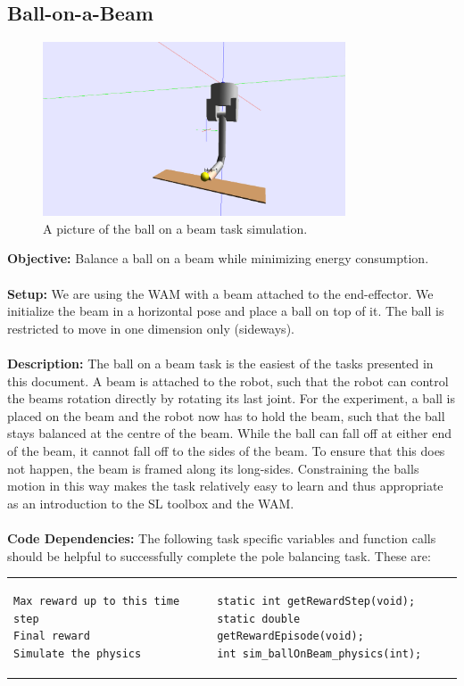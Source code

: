 \documentclass[11pt, article, colorback]{article}
\begin{document}
\subsection{Ball-on-a-Beam}
\begin{figure}
\centering
 \includegraphics[width=0.8\textwidth]{Pics/BallOnBeam.png}
  \caption{A picture of the ball on a beam task simulation.}
  \label{pic:poleBalancing}
\end{figure}
%
\textbf{Objective:} Balance a ball on a beam while minimizing energy consumption. \\ \\
%
\textbf{Setup:} We are using the WAM with a beam attached to the end-effector.
		We initialize the beam in a horizontal pose and place a ball on top of it. The ball 
		is restricted to move in one dimension only (sideways).
		 \\ \\
%
\textbf{Description:}
The ball on a beam task is the easiest of the tasks presented in this document. A beam is attached 
to the robot, such that the robot can control the beams rotation directly by rotating its last joint. 
For the experiment, a ball is placed on the beam and the robot now has to hold the beam, such 
that the ball stays balanced at the centre of the beam. While the ball can fall off at either end of the beam, 
it cannot fall off to the sides of the beam. To ensure that this does not happen, the beam is framed  
along its long-sides. Constraining the balls motion in this way makes the task relatively easy to learn and thus 
appropriate as an introduction to the SL toolbox and the WAM.
		\\  \\
%
\textbf{Code Dependencies:} The following task specific variables and function calls should be helpful to 
successfully complete the pole balancing task. These are: \\
\begin{tabular}{ m{7cm} m{4cm}}
\begin{lstlisting}
Max reward up to this time step
Final reward
Simulate the physics
\end{lstlisting}
& \begin{lstlisting}
static int getRewardStep(void);
static double getRewardEpisode(void);
int sim_ballOnBeam_physics(int);
\end{lstlisting}
\end{tabular} \\
\end{document}
